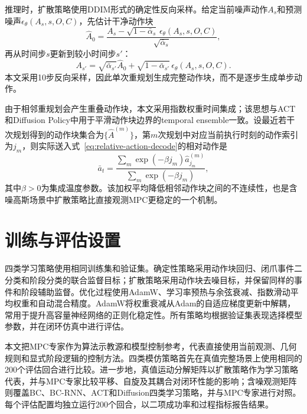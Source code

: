 推理时，扩散策略使用DDIM形式的确定性反向采样\citep{song2020denoising}。给定当前噪声动作$A_s$和预测噪声$\epsilon_\theta(A_s,s,O,C)$，先估计干净动作块
\begin{equation}
    \hat{A}_0=\frac{A_s-\sqrt{1-\bar{\alpha}_s}\,
    \epsilon_\theta(A_s,s,O,C)}{\sqrt{\bar{\alpha}_s}},
    \label{eq:ddim-x0}
\end{equation}
再从时间步$s$更新到较小时间步$s'$：
\begin{equation}
    A_{s'}=\sqrt{\bar{\alpha}_{s'}}\hat{A}_0
    +\sqrt{1-\bar{\alpha}_{s'}}\,\epsilon_\theta(A_s,s,O,C).
    \label{eq:ddim-update}
\end{equation}
本文采用10步反向采样，因此单次重规划生成完整动作块，而不是逐步生成单步动作。

由于相邻重规划会产生重叠动作块，本文采用指数权重时间集成；该思想与ACT和Diffusion Policy中用于平滑动作块边界的temporal ensemble一致\citep{zhao2023learning,chi2023diffusion}。设最近若干次规划得到的动作块集合为$\{\hat{A}^{(m)}\}$，第$m$次规划中对应当前执行时刻的动作索引为$j_m$，则实际送入式~\eqref{eq:relative-action-decode}的相对动作是
\begin{equation}
    \bar{a}_t=
    \frac{\sum_m \exp(-\beta j_m)\hat{a}^{(m)}_{j_m}}
    {\sum_m \exp(-\beta j_m)},
    \label{eq:temporal-ensemble}
\end{equation}
其中$\beta>0$为集成温度参数。该加权平均降低相邻动作块之间的不连续性，也是含噪高斯场景中扩散策略比直接观测MPC更稳定的一个机制。

\section{训练与评估设置}

四类学习策略使用相同训练集和验证集。确定性策略采用动作块回归、闭爪事件二分类和阶段分类的联合监督目标；扩散策略采用动作块去噪目标，并保留同样的事件和阶段辅助监督。优化过程使用AdamW、学习率预热与余弦衰减、指数滑动平均权重和自动混合精度。AdamW将权重衰减从Adam的自适应梯度更新中解耦，常用于提升高容量神经网络的正则化稳定性\citep{loshchilov2019decoupled}。所有策略均根据验证集表现选择模型参数，并在闭环仿真中进行评估。

本文把MPC专家作为算法示教源和模型控制参考，代表直接使用当前观测、几何规则和显式阶段逻辑的控制方法。四类模仿策略首先在真值完整场景上使用相同的200个评估回合进行比较。进一步地，真值运动分解矩阵以扩散策略作为学习策略代表，并与MPC专家比较平移、自旋及其耦合对闭环性能的影响；含噪观测矩阵则覆盖BC、BC-RNN、ACT和Diffusion四类学习策略，并与MPC专家进行对照。每个评估配置均独立运行200个回合，以二项成功率和过程指标报告结果。

